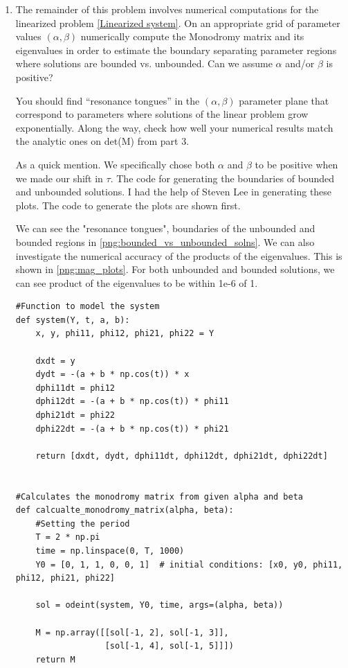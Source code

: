 \documentclass[12pt]{article}
\newcommand{\jump}{\vspace{5mm}}
\begin{document}
\begin{enumerate}[]
\jump
\hrule
\jump
\item The remainder of this problem involves numerical computations for the linearized problem \ref{Linearized system}. On an appropriate grid of parameter values $(\alpha, \beta)$ numerically compute the Monodromy matrix and its eigenvalues in order to estimate the boundary separating parameter regions where solutions are bounded vs. unbounded. Can we assume $\alpha$ and/or $\beta$ is positive?

You should find “resonance tongues” in the $(\alpha, \beta)$ parameter plane that correspond to parameters where solutions of the linear problem grow exponentially. Along the way, check how
well your numerical results match the analytic ones on det(M) from part 3.

\jump
\begin{solution}
    As a quick mention. We specifically chose both $\alpha$ and $\beta$ to be positive when we made our shift in $\tau$. The code for generating the boundaries of bounded and unbounded solutions. I had the help of Steven Lee in generating these plots. The code to generate the plots are shown first.

    We can see the "resonance tongues", boundaries of the unbounded and bounded regions in \ref{png:bounded_vs_unbounded_solns}. We can also investigate the numerical accuracy of the products of the eigenvalues. This is shown in \ref{png:mag_plots}. For both unbounded and bounded solutions, we can see product of the eigenvalues to be within 1e-6 of 1. 
\end{solution}
\jump

\begin{lstlisting}
#Function to model the system
def system(Y, t, a, b):
    x, y, phi11, phi12, phi21, phi22 = Y

    dxdt = y
    dydt = -(a + b * np.cos(t)) * x
    dphi11dt = phi12
    dphi12dt = -(a + b * np.cos(t)) * phi11
    dphi21dt = phi22
    dphi22dt = -(a + b * np.cos(t)) * phi21

    return [dxdt, dydt, dphi11dt, dphi12dt, dphi21dt, dphi22dt]
    

#Calculates the monodromy matrix from given alpha and beta
def calcualte_monodromy_matrix(alpha, beta):
    #Setting the period
    T = 2 * np.pi
    time = np.linspace(0, T, 1000)
    Y0 = [0, 1, 1, 0, 0, 1]  # initial conditions: [x0, y0, phi11, phi12, phi21, phi22]

    sol = odeint(system, Y0, time, args=(alpha, beta))

    M = np.array([[sol[-1, 2], sol[-1, 3]],
                  [sol[-1, 4], sol[-1, 5]]])
    return M



\end{lstlisting}
\end{enumerate}
\end{document}
